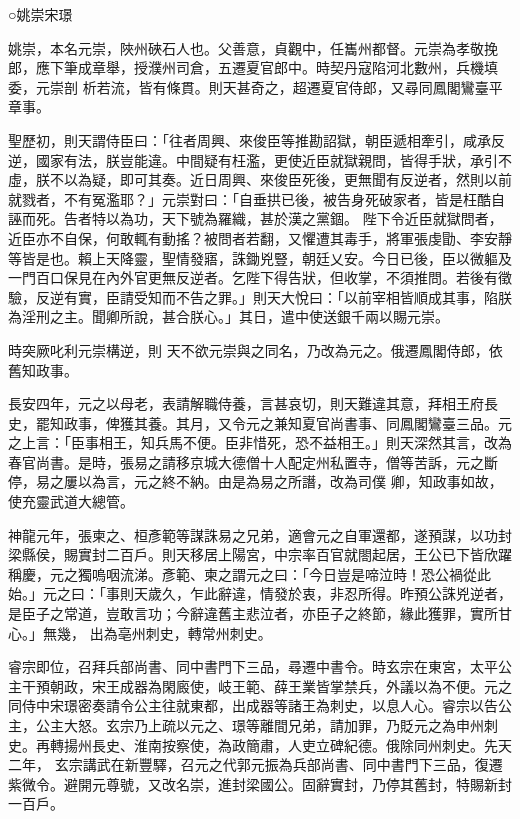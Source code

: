 
\begin{pinyinscope}

 ○姚崇宋璟



 姚崇，本名元崇，陜州硤石人也。父善意，貞觀中，任巂州都督。元崇為孝敬挽郎，應下筆成章舉，授濮州司倉，五遷夏官郎中。時契丹寇陷河北數州，兵機填委，元崇剖
 析若流，皆有條貫。則天甚奇之，超遷夏官侍郎，又尋同鳳閣鸞臺平章事。



 聖歷初，則天謂侍臣曰：「往者周興、來俊臣等推勘詔獄，朝臣遞相牽引，咸承反逆，國家有法，朕豈能違。中間疑有枉濫，更使近臣就獄親問，皆得手狀，承引不虛，朕不以為疑，即可其奏。近日周興、來俊臣死後，更無聞有反逆者，然則以前就戮者，不有冤濫耶？」元崇對曰：「自垂拱已後，被告身死破家者，皆是枉酷自誣而死。告者特以為功，天下號為羅織，甚於漢之黨錮。
 陛下令近臣就獄問者，近臣亦不自保，何敢輒有動搖？被問者若翻，又懼遭其毒手，將軍張虔勖、李安靜等皆是也。賴上天降靈，聖情發寤，誅鋤兇豎，朝廷乂安。今日已後，臣以微軀及一門百口保見在內外官更無反逆者。乞陛下得告狀，但收掌，不須推問。若後有徵驗，反逆有實，臣請受知而不告之罪。」則天大悅曰：「以前宰相皆順成其事，陷朕為淫刑之主。聞卿所說，甚合朕心。」其日，遣中使送銀千兩以賜元崇。



 時突厥叱利元崇構逆，則
 天不欲元崇與之同名，乃改為元之。俄遷鳳閣侍郎，依舊知政事。



 長安四年，元之以母老，表請解職侍養，言甚哀切，則天難違其意，拜相王府長史，罷知政事，俾獲其養。其月，又令元之兼知夏官尚書事、同鳳閣鸞臺三品。元之上言：「臣事相王，知兵馬不便。臣非惜死，恐不益相王。」則天深然其言，改為春官尚書。是時，張易之請移京城大德僧十人配定州私置寺，僧等苦訴，元之斷停，易之屢以為言，元之終不納。由是為易之所譖，改為司僕
 卿，知政事如故，使充靈武道大總管。



 神龍元年，張柬之、桓彥範等謀誅易之兄弟，適會元之自軍還都，遂預謀，以功封梁縣侯，賜實封二百戶。則天移居上陽宮，中宗率百官就閤起居，王公已下皆欣躍稱慶，元之獨嗚咽流涕。彥範、柬之謂元之曰：「今日豈是啼泣時！恐公禍從此始。」元之曰：「事則天歲久，乍此辭違，情發於衷，非忍所得。昨預公誅兇逆者，是臣子之常道，豈敢言功；今辭違舊主悲泣者，亦臣子之終節，緣此獲罪，實所甘心。」無幾，
 出為亳州刺史，轉常州刺史。



 睿宗即位，召拜兵部尚書、同中書門下三品，尋遷中書令。時玄宗在東宮，太平公主干預朝政，宋王成器為閑廄使，岐王範、薛王業皆掌禁兵，外議以為不便。元之同侍中宋璟密奏請令公主往就東都，出成器等諸王為刺史，以息人心。睿宗以告公主，公主大怒。玄宗乃上疏以元之、璟等離間兄弟，請加罪，乃貶元之為申州刺史。再轉揚州長史、淮南按察使，為政簡肅，人吏立碑紀德。俄除同州刺史。先天二年，
 玄宗講武在新豐驛，召元之代郭元振為兵部尚書、同中書門下三品，復遷紫微令。避開元尊號，又改名崇，進封梁國公。固辭實封，乃停其舊封，特賜新封一百戶。




\end{pinyinscope}
